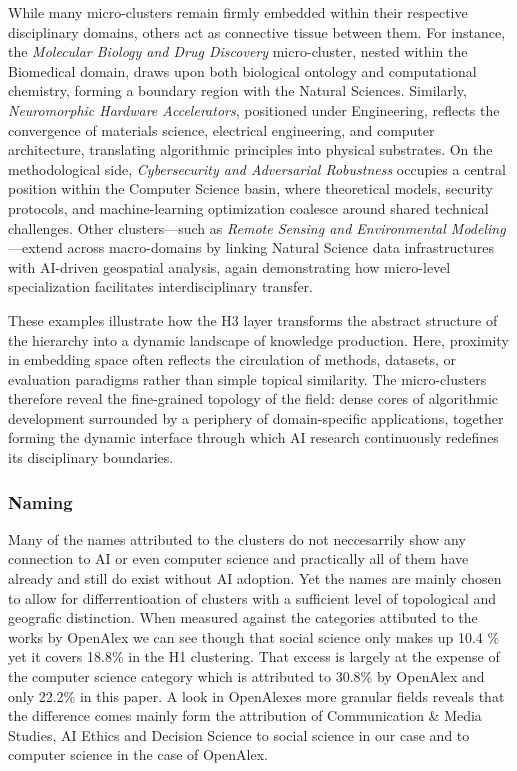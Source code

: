 \documentclass{article}
\begin{document}
While many micro-clusters remain firmly embedded within their respective disciplinary domains, others act as connective tissue between them. For instance, the \emph{Molecular Biology and Drug Discovery} micro-cluster, nested within the Biomedical domain, draws upon both biological ontology and computational chemistry, forming a boundary region with the Natural Sciences. Similarly, \emph{Neuromorphic Hardware Accelerators}, positioned under Engineering, reflects the convergence of materials science, electrical engineering, and computer architecture, translating algorithmic principles into physical substrates. On the methodological side, \emph{Cybersecurity and Adversarial Robustness} occupies a central position within the Computer Science basin, where theoretical models, security protocols, and machine-learning optimization coalesce around shared technical challenges. Other clusters—such as \emph{Remote Sensing and Environmental Modeling}—extend across macro-domains by linking Natural Science data infrastructures with AI-driven geospatial analysis, again demonstrating how micro-level specialization facilitates interdisciplinary transfer.

These examples illustrate how the H3 layer transforms the abstract structure of the hierarchy into a dynamic landscape of knowledge production. Here, proximity in embedding space often reflects the circulation of methods, datasets, or evaluation paradigms rather than simple topical similarity. The micro-clusters therefore reveal the fine-grained topology of the field: dense cores of algorithmic development surrounded by a periphery of domain-specific applications, together forming the dynamic interface through which AI research continuously redefines its disciplinary boundaries.



\subsubsection{Naming}

Many of the names attributed to the clusters do not neccesarrily show any connection to AI or even computer science and practically all of them have already and still do exist without AI adoption. Yet the names are mainly chosen to allow for differrentioation of clusters with a sufficient level of topological and geografic distinction. When measured against the categories attibuted to the works by OpenAlex we can see though that social science only makes up 10.4 \% yet it covers 18.8\% in the H1 clustering. That excess is largely at the expense of the computer science category which is attributed to 30.8\% by OpenAlex and only 22.2\% in this paper. A look in OpenAlexes more granular fields reveals that the difference comes mainly form the attribution of Communication \& Media Studies, AI Ethics and Decision Science to social science in our case and to computer science in the case of OpenAlex. 
\end{document}
